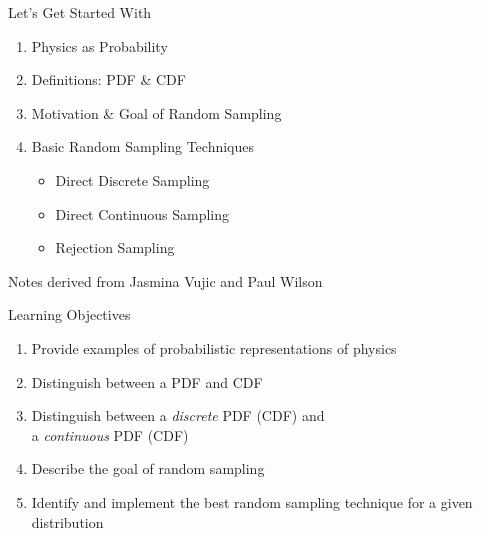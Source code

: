 \documentclass[xcolor=x11names,compress]{beamer}
\renewcommand{\(}{\begin{columns}}
\renewcommand{\)}{\end{columns}}
\newcommand{\<}[1]{\begin{column}{#1}}
\renewcommand{\>}{\end{column}}
\begin{document}
\begin{frame}{Let's Get Started With}

    \begin{enumerate}
    \item Physics as Probability
    \item Definitions: PDF \& CDF
    \item Motivation \& Goal of Random Sampling
    \item Basic Random Sampling Techniques
      \begin{itemize}
        \item Direct Discrete Sampling
        \item Direct Continuous Sampling
        \item Rejection Sampling
      \end{itemize}
    \end{enumerate}

\vspace*{1em}
Notes derived from Jasmina Vujic and Paul Wilson
\end{frame}



\begin{frame}{Learning Objectives}

    \begin{enumerate}
    \item Provide examples of probabilistic
representations of physics
    \item Distinguish between a PDF and CDF
    \item Distinguish between a \textit{discrete} PDF
(CDF) and \\ a \textit{continuous} PDF (CDF)
    \item Describe the goal of random sampling
    \item Identify and implement the best
random sampling technique for a given
distribution
    \end{enumerate}

\end{frame}
\end{document}
